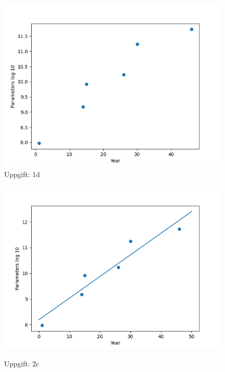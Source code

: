 \documentclass[a4paper]{article}
\begin{document}
            \begin{figure} [h]
                \includegraphics[width=\linewidth]{1c.png}   
                \caption{Uppgift: 1d}
            \end{figure}

            \begin{figure} [h]
                \includegraphics[width=\linewidth]{2c.png}
                \label{fig:rapport}    
                \caption{Uppgift: 2c}
            \end{figure}
\end{document}
